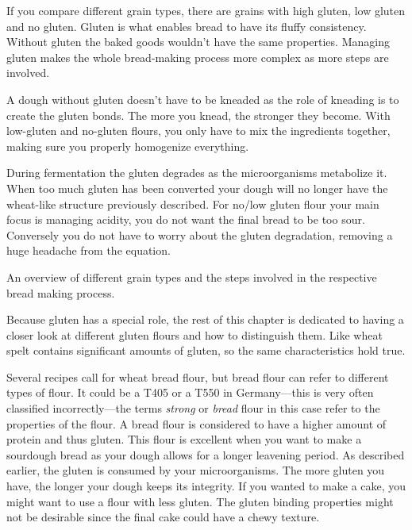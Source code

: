 If you compare different grain types, there are grains with high gluten, low gluten
and no gluten. Gluten is what enables bread to have its fluffy consistency.
Without gluten the baked goods wouldn't have the same properties. Managing
gluten makes the whole bread-making process more complex as more steps are involved.

A dough without gluten doesn't have to be kneaded as the role of kneading is
to create
the gluten bonds. The more you knead, the stronger they become. With low-gluten
and no-gluten flours, you only have to mix the ingredients together, making
sure you properly homogenize everything.

During fermentation
the gluten degrades as the microorganisms metabolize it. When too much gluten
has been converted your dough will no longer have the wheat-like structure previously
described. For no/low gluten flour your main focus is managing acidity, you do not
want the final bread to be too sour. Conversely you do not have to worry about
the gluten degradation, removing a huge headache from the equation.

\begin{table}[!htb]
    \centering
        
        \caption[Different types of grain]{An overview of different grain
          types and the steps involved in the respective bread making process.}
\end{table}

Because gluten has a special role, the rest of this chapter is dedicated to having a
closer look at different gluten flours and how to distinguish them. Like wheat
spelt contains significant amounts of gluten, so the same characteristics hold
true.

Several recipes call for wheat bread flour, but bread flour can refer to different types
of flour. It could be a T405 or a T550 in Germany---this is very often
classified incorrectly---the terms \emph{strong} or \emph{bread} flour in this case
refer to the properties of the flour. A bread flour is considered to have a
higher amount of protein and thus gluten. This flour is excellent when you
want to make a sourdough bread as your dough allows for a longer leavening
period. As described earlier, the gluten is consumed by your microorganisms.
The more gluten you have, the longer your dough keeps its integrity. If you wanted
to make a cake, you might want to use a flour with less gluten. The gluten binding
properties might not be desirable since the final cake could have a chewy texture.

